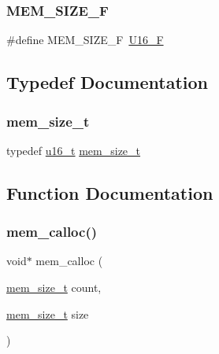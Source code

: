 \subsubsection{\texorpdfstring{M\+E\+M\+\_\+\+S\+I\+Z\+E\+\_\+F}{MEM\_SIZE\_F}}
{\footnotesize\ttfamily \#define M\+E\+M\+\_\+\+S\+I\+Z\+E\+\_\+F~\hyperlink{group__compiler__abstraction_gaa9d7f6eb2ee9fcc5eda3545dbb1886e0}{U16\+\_\+F}}



\subsection{Typedef Documentation}
\mbox{\label{openmote-cc2538_2lwip_2src_2include_2lwip_2mem_8h_a49bff6e5dd4cb95fe6dc0670962bbf54}} 
\subsubsection{\texorpdfstring{mem\+\_\+size\+\_\+t}{mem\_size\_t}}
{\footnotesize\ttfamily typedef \hyperlink{group__compiler__abstraction_ga77570ac4fcab86864fa1916e55676da2}{u16\+\_\+t} \hyperlink{native_2lwip_2src_2include_2lwip_2mem_8h_a49bff6e5dd4cb95fe6dc0670962bbf54}{mem\+\_\+size\+\_\+t}}



\subsection{Function Documentation}
\mbox{\label{openmote-cc2538_2lwip_2src_2include_2lwip_2mem_8h_ab0bdc525971701883f2065e7fb257a24}} 
\subsubsection{\texorpdfstring{mem\+\_\+calloc()}{mem\_calloc()}}
{\footnotesize\ttfamily void$\ast$ mem\+\_\+calloc (\begin{DoxyParamCaption}\item[{\hyperlink{native_2lwip_2src_2include_2lwip_2mem_8h_a49bff6e5dd4cb95fe6dc0670962bbf54}{mem\+\_\+size\+\_\+t}}]{count,  }\item[{\hyperlink{native_2lwip_2src_2include_2lwip_2mem_8h_a49bff6e5dd4cb95fe6dc0670962bbf54}{mem\+\_\+size\+\_\+t}}]{size }\end{DoxyParamCaption})}

